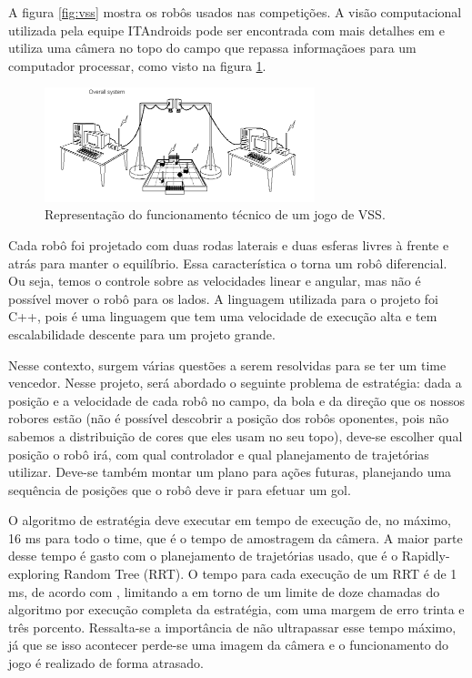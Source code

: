 \documentclass[a4paper,12pt]{article}
\begin{document}
A figura \ref{fig:vss} mostra os robôs usados nas competições. A visão computacional utilizada pela equipe ITAndroids pode ser encontrada com mais detalhes em \cite{tasinaffo_ic} e utiliza uma câmera no topo do campo que repassa informaçãoes para um computador processar, como visto na figura \ref{fig:funcioamento}.

\begin{figure}[H]
	\centering
		\includegraphics[width=0.7\textwidth]{figures/overview.png}
  \caption{Representação do funcionamento técnico de um jogo de VSS.}
	\label{fig:funcioamento}
\end{figure}

Cada robô foi projetado com duas rodas laterais e duas esferas livres à frente e atrás para manter o equilíbrio. Essa característica o torna um robô diferencial. Ou seja, temos o controle sobre as velocidades linear e angular, mas não é possível mover o robô para os lados. A linguagem utilizada para o projeto foi C++, pois é uma linguagem que tem uma velocidade de execução alta e tem escalabilidade descente para um projeto grande. 

Nesse contexto, surgem várias questões a serem resolvidas para se ter um time vencedor. Nesse projeto, será abordado o seguinte problema de estratégia: dada a posição e a velocidade de cada robô no campo, da bola e da direção que os nossos robores estão (não é possível descobrir a posição dos robôs oponentes, pois não sabemos a distribuição de cores que eles usam no seu topo), deve-se escolher qual posição o robô irá, com qual controlador  e qual planejamento de trajetórias utilizar. Deve-se também montar um plano para ações futuras, planejando uma sequência de posições que o robô deve ir para efetuar um gol.

O algoritmo de estratégia deve executar em tempo de execução de, no máximo, 16 ms para todo o time, que é o tempo de amostragem da câmera. A maior parte desse tempo é gasto com o planejamento de trajetórias usado, que é o Rapidly-exploring Random Tree (RRT). O tempo para cada execução de um RRT é de 1 ms, de acordo com \cite{franzoni_rrt}, limitando a em torno de um limite de doze chamadas do algoritmo por execução completa da estratégia, com uma margem de erro trinta e três porcento. Ressalta-se a importância de não ultrapassar esse tempo máximo, já que se isso acontecer perde-se uma imagem da câmera e o funcionamento do jogo é realizado de forma atrasado.
\end{document}

